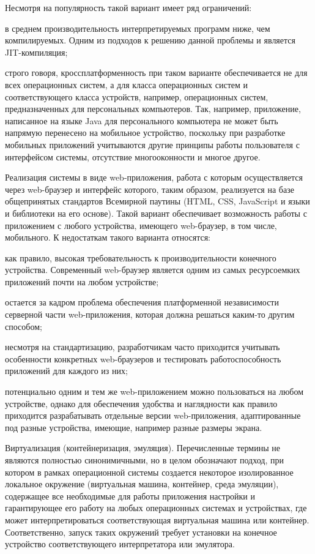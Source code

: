 \begin{textitemize}
	Несмотря на популярность такой вариант имеет ряд ограничений:
	\begin{textitemize}
		\item в среднем производительность интерпретируемых программ ниже, чем компилируемых. Одним из подходов к решению данной проблемы и является JIT-компиляция;
		\item строго говоря, кроссплатформенность при таком варианте обеспечивается не для всех операционных систем, а для класса операционных систем и соответствующего класса устройств, например, операционных систем, предназначенных для персональных компьютеров. Так, например, приложение, написанное на языке Java для персонального компьютера не может быть напрямую перенесено на мобильное устройство, поскольку при разработке мобильных приложений учитываются другие принципы работы пользователя с интерфейсом системы, отсутствие многооконности и многое другое.
	\end{textitemize}
	\item Реализация системы в виде web-приложения, работа с которым осуществляется через web-браузер и интерфейс которого, таким образом, реализуется на базе общепринятых стандартов Всемирной паутины (HTML, CSS, JavaScript и языки и библиотеки на его основе). Такой вариант обеспечивает возможность работы с приложением с любого устройства, имеющего web-браузер, в том числе, мобильного. К недостаткам такого варианта относятся:
	\begin{textitemize}
		\item как правило, высокая требовательность к производительности конечного устройства. Современный web-браузер является одним из самых ресурсоемких приложений почти на любом устройстве;
		\item остается за кадром проблема обеспечения платформенной независимости серверной части web-приложения, которая должна решаться каким-то другим способом;
		\item несмотря на стандартизацию, разработчикам часто приходится учитывать особенности конкретных web-браузеров и тестировать работоспособность приложений для каждого из них;
		\item потенциально одним и тем же web-приложением можно пользоваться на любом устройстве, однако для обеспечения удобства и наглядности как правило приходится разрабатывать отдельные версии web-приложения, адаптированные под разные устройства, имеющие, например разные размеры экрана.
	\end{textitemize}
	\item Виртуализация (контейнеризация, эмуляция). Перечисленные термины не являются полностью синонимичными, но в целом обозначают подход, при котором в рамках операционной системы создается некоторое изолированное локальное окружение (виртуальная машина, контейнер, среда эмуляции), содержащее все необходимые для работы приложения настройки и гарантирующее его работу на любых операционных системах и устройствах, где может интерпретироваться соответствующая виртуальная машина или контейнер. Соответственно, запуск таких окружений требует установки на конечное устройство соответствующего интерпретатора или эмулятора.
	

\end{textitemize}
